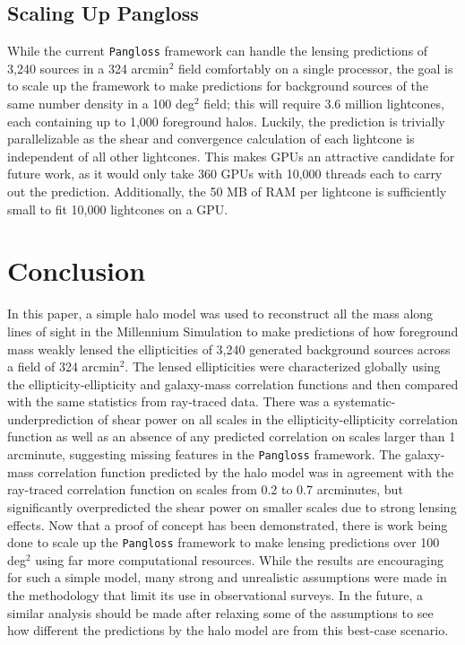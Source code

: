 \documentclass[%
 reprint,
 amsmath,amssymb,
 aps,nofootinbib
]{revtex4-1}
\begin{document}
\subsection*{Scaling Up Pangloss}

While the current \texttt{Pangloss} framework can handle the lensing predictions of 3,240 sources in a 324 arcmin$^2$ field comfortably on a single processor, the goal is to scale up the framework to make predictions for background sources of the same number density in a 100 deg$^2$ field; this will require 3.6 million lightcones, each containing up to 1,000 foreground halos. Luckily, the prediction is trivially parallelizable as the shear and convergence calculation of each lightcone is independent of all other lightcones. This makes GPUs an attractive candidate for future work, as it would only take 360 GPUs with 10,000 threads each to carry out the prediction. Additionally, the 50 MB of RAM per lightcone is sufficiently small to fit 10,000 lightcones on a GPU.

\section{Conclusion}

In this paper, a simple halo model was used to reconstruct all the mass along lines of sight in the Millennium Simulation to make predictions of how foreground mass weakly lensed the ellipticities of 3,240 generated background sources across a field of 324 arcmin$^2$. The lensed ellipticities were characterized globally using the ellipticity-ellipticity and galaxy-mass correlation functions and then compared with the same statistics from ray-traced data. There was a systematic-underprediction of shear power on all scales in the ellipticity-ellipticity correlation function as well as an absence of any predicted correlation on scales larger than 1 arcminute, suggesting missing features in the \texttt{Pangloss} framework. The galaxy-mass correlation function predicted by the halo model was in agreement with the ray-traced correlation function on scales from 0.2 to 0.7 arcminutes, but significantly overpredicted the shear power on smaller scales due to strong lensing effects. Now that a proof of concept has been demonstrated, there is work being done to scale up the \texttt{Pangloss} framework to make lensing predictions over 100 deg$^2$ using far more computational resources. While the results are encouraging for such a simple model, many strong and unrealistic assumptions were made in the methodology that limit its use in observational surveys. In the future, a similar analysis should be made after relaxing some of the assumptions to see how different the predictions by the halo model are from this best-case scenario.  
\end{document}
